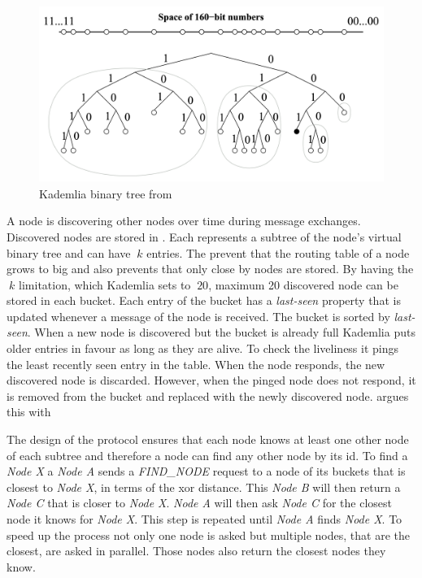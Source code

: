 \begin{figure}
\centering
\includegraphics[width=1\textwidth]{graphics/kademlia-binary-tree.png}
\caption{Kademlia binary tree from \cite[\S2]{kademlia}}
\label{fig:kad-binary-tree}
\end{figure}

A node is discovering other nodes over time during message exchanges. Discovered nodes are stored in . Each  represents a subtree of the node's virtual binary tree and can have $\ k $ entries. The  prevent that the routing table of a node grows to big and also prevents that only close by nodes are stored. By having the $\ k $ limitation, which Kademlia sets to $\ 20 $, maximum 20 discovered node can be stored in each bucket. 
Each entry of the bucket has a \textit{last-seen} property that is updated whenever a message of the node is received. The bucket is sorted by \textit{last-seen}. When a new node is discovered but the bucket is already full Kademlia puts older entries in favour as long as they are alive. To check the liveliness it pings the least recently seen entry in the table. When the node responds, the new discovered node is discarded. However, when the pinged node does not respond, it is removed from the bucket and replaced with the newly discovered node. \citet[\S2.2]{kademlia} argues this with 

The design of the protocol ensures that each node knows at least one other node of each subtree and therefore a node can find any other node by its id. To find a \textit{Node X} a \textit{Node A} sends a \textit{FIND\_NODE} request to a node of its buckets that is closest to \textit{Node X}, in terms of the \gls{xor} distance. This \textit{Node B} will then return a \textit{Node C} that is closer to \textit{Node X}. \textit{Node A} will then ask \textit{Node C} for the closest node it knows for \textit{Node X}. This step is repeated until \textit{Node A} finds \textit{Node X}. To speed up the process not only one node is asked but multiple nodes, that are the closest, are asked in parallel. Those nodes also return the closest nodes they know.

